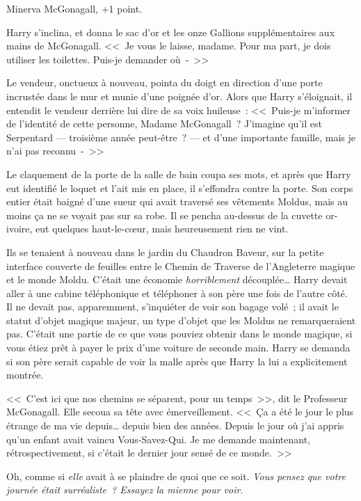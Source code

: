 Minerva McGonagall, +1 point.

Harry s'inclina, et donna le sac d'or et les onze Gallions supplémentaires aux mains de McGonagall. <<~Je vous le laisse, madame. Pour ma part, je dois utiliser les toilettes. Puis-je demander où~-~>>

Le vendeur, onctueux à nouveau, pointa du doigt en direction d'une porte incrustée dans le mur et munie d'une poignée d'or. Alors que Harry s'éloignait, il entendit le vendeur derrière lui dire de sa voix huileuse~: <<~Puis-je m'informer de l'identité de cette personne, Madame McGonagall~? J'imagine qu'il est Serpentard — troisième année peut-être~? — et d'une importante famille, mais je n'ai pas reconnu~-~>>

Le claquement de la porte de la salle de bain coupa ses mots, et après que Harry eut identifié le loquet et l'ait mis en place, il s'effondra contre la porte. Son corps entier était baigné d'une sueur qui avait traversé ses vêtements Moldus, mais au moins ça ne se voyait pas sur sa robe. Il se pencha au-dessus de la cuvette or-ivoire, eut quelques haut-le-cœur, mais heureusement rien ne vint.

\later

Ils se tenaient à nouveau dans le jardin du Chaudron Baveur, sur la petite interface couverte de feuilles entre le Chemin de Traverse de l'Angleterre magique et le monde Moldu. C'était une économie \emph{horriblement} découplée… Harry devait aller à une cabine téléphonique et téléphoner à son père une fois de l'autre côté. Il ne devait pas, apparemment, s'inquiéter de voir son bagage volé~; il avait le statut d'objet magique majeur, un type d'objet que les Moldus ne remarqueraient pas. C'était une partie de ce que vous pouviez obtenir dans le monde magique, si vous étiez prêt à payer le prix d'une voiture de seconde main. Harry se demanda si son père serait capable de voir la malle après que Harry la lui a explicitement montrée.

<<~C'est ici que nos chemins se séparent, pour un temps~>>, dit le Professeur McGonagall. Elle secoua sa tête avec émerveillement. <<~Ça a été le jour le plus étrange de ma vie depuis… depuis bien des années. Depuis le jour où j'ai appris qu'un enfant avait vaincu Vous-Savez-Qui. Je me demande maintenant, rétrospectivement, si c'était le dernier jour sensé de ce monde.~>>

Oh, comme si \emph{elle} avait à se plaindre de quoi que ce soit. \emph{Vous pensez que votre journée était surréaliste~? Essayez la mienne pour voir}.

